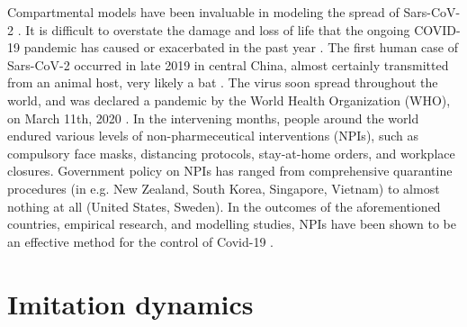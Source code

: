 Compartmental models have been invaluable in modeling the spread of Sars-CoV-2 \cite{thompson2020epidemiological}. It is difficult to overstate the damage and loss of life that the ongoing COVID-19 pandemic has caused or exacerbated in the past year \cite{miller2020disease,who2021impact}. The first human case of Sars-CoV-2 occurred in late 2019 in central China, almost certainly transmitted from an animal host, very likely a bat \cite{andersen2020proximal,rasmussen2021origins,zhu2020novel}. The virus soon spread throughout the world, and was declared a pandemic by the World Health Organization (WHO), on March 11th, 2020 \cite{who2020announces}. In the intervening months, people around the world endured various levels of non-pharmeceutical interventions (NPIs), such as compulsory face masks, distancing protocols, stay-at-home orders, and workplace closures. Government policy on NPIs has ranged from comprehensive quarantine procedures (in e.g. New Zealand, South Korea, Singapore, Vietnam) to almost nothing at all (United States, Sweden). In the outcomes of the aforementioned countries, empirical research, and modelling studies, NPIs have been shown to be an effective method for the control of Covid-19 \cite{anderson2020estimating,flaxman2020estimating,ferguson2020report,demirguc2020sooner}. 



\section{Imitation dynamics}


